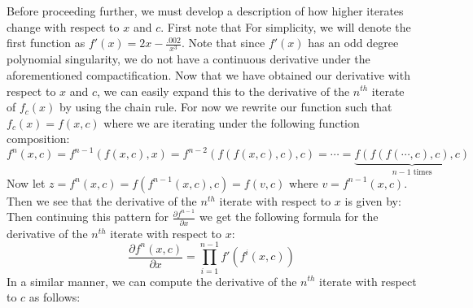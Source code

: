 			Before proceeding further, we must develop a description of how higher iterates change with respect to $x$ and $c$. First note that 
			For simplicity, we will denote the first function as $f' (x) = 2x - \frac{.002}{x^3}$. Note that since $f' (x)$ has an odd degree polynomial singularity, we do not have a continuous derivative under the aforementioned compactification. Now that we have obtained our derivative with respect to $x$ and $c$, we can easily expand this to the derivative of the $n^{th}$ iterate of $f_c (x)$ by using the chain rule. For now we rewrite our function such that $f_c (x) = f (x,c)$ where we are iterating under the following function composition:
			\[
				f^n (x,c) = f^{n-1} (f (x,c),x) = f^{n-2} (f (f (x,c),c),c) = \cdots = \underbrace{f (f (f (\cdots,c),c),c)}_{n - 1 \text{ times}}
			\]
			Now let $z = f^n (x,c) = f\left (f^{n-1} (x,c),c\right) = f (v, c)$ where $v = f^{n-1} (x,c)$. Then we see that the derivative of the $n^{th}$ iterate with respect to $x$ is given by:
			Then continuing this pattern for $\frac{\partial f^{n-1}}{\partial x}$ we get the following formula for the derivative of the $n^{th}$ iterate with respect to $x$:
			\[
				\frac{\partial f^n (x,c)}{\partial x} = \prod_{i = 1}^{n-1} f' (f^i (x,c))
			\]
			In a similar manner, we can compute the derivative of the $n^{th}$ iterate with respect to $c$ as follows:
